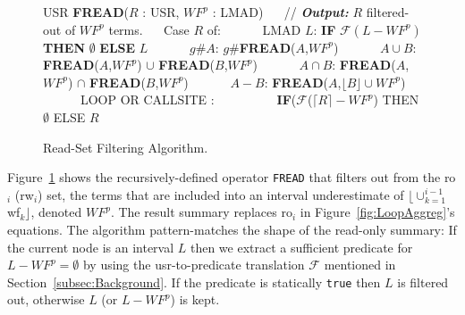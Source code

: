 \documentclass[10pt,nocopyrightspace]{sigplanconf}
\begin{document}
\begin{figure}[t]
\begin{scriptsize}
USR {\bf FREAD}($R$ : USR, $WF^p$ : LMAD) \vspace{1ex} \newline
$\mbox{ }\mbox{ }$// {\bf {\em Output:}} $R$ filtered-out of $WF^p$ terms. \vspace{1ex} \newline
$\mbox{ }\mbox{ }$Case $R$ of: \vspace{1ex} \newline
$\mbox{ }\mbox{ }\mbox{ }\mbox{ }$ LMAD $L$: %
{\bf IF} $\mathcal{F}(L - WF^p)$ {\bf THEN} $\emptyset$ {\bf ELSE} $L$ \vspace{1ex} \newline
$\mbox{ }\mbox{ }\mbox{ }\mbox{ }$ $g\#A$: $g\#${\bf FREAD}($A$,$WF^p$)  \vspace{1ex} \newline   
$\mbox{ }\mbox{ }\mbox{ }\mbox{ }$ $A \cup B$: {\bf FREAD}($A$,$WF^p$) $\cup$ {\bf FREAD}($B$,$WF^p$) \vspace{1ex} \newline
$\mbox{ }\mbox{ }\mbox{ }\mbox{ }$ $A \cap B$: {\bf FREAD}($A$,$WF^p$) $\cap$ {\bf FREAD}($B$,$WF^p$) \vspace{1ex} \newline
$\mbox{ }\mbox{ }\mbox{ }\mbox{ }$ $A - B$: {\bf FREAD}($A$,$\lfloor B \rfloor \cup WF^p$)   \vspace{1ex} \newline
$\mbox{ }\mbox{ }\mbox{ }\mbox{ }$ LOOP OR CALLSITE :   \vspace{1ex} \newline   
$\mbox{ }\mbox{ }\mbox{ }$ 
$\mbox{ }\mbox{ }\mbox{ }$ 
          {\bf IF}($\mathcal{F}$($\lceil R \rceil - WF^p$) THEN $\emptyset$ ELSE $R$
\end{scriptsize}
\caption{ Read-Set Filtering Algorithm.}
\label{fig:ReadFilt} %
\end{figure}
 

Figure~\ref{fig:ReadFilt} shows the recursively-defined operator {\tt FREAD} that
filters out from the {\sc ro}$_i$ ({\sc rw}$_i$) set, the terms that are included 
into an interval underestimate of $\lfloor\cup_{k=1}^{i-1}${\sc wf}$_k\rfloor$, 
denoted $WF^p$.
The result summary replaces {\sc ro}$_i$ in Figure~\ref{fig:LoopAggreg}'s equations.
%
The algorithm pattern-matches the shape of the read-only summary:
If the current node is an interval $L$ then we extract a %
sufficient predicate for $L - WF^p = \emptyset$ by using the {\sc usr}-to-predicate
translation $\mathcal{F}$ mentioned in Section~\ref{subsec:Background}.   
If the predicate is statically {\tt true}  then $L$ is filtered out, 
otherwise $L$ (or $L-WF^p$) is kept.
\end{document}
